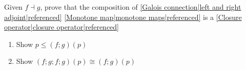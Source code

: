 

Given $f \dashv g$, prove that the composition of \ref{Galois connection|left and right adjoint|referenced} \ref{Monotone map|monotone maps|referenced} is a \ref{Closure operator|closure operator|referenced}
    \begin{enumerate}
      \item Show $p \leq (f;g)(p)$
      \item Show $(f;g;f;g)(p) \cong (f;g)(p)$
    \end{enumerate}